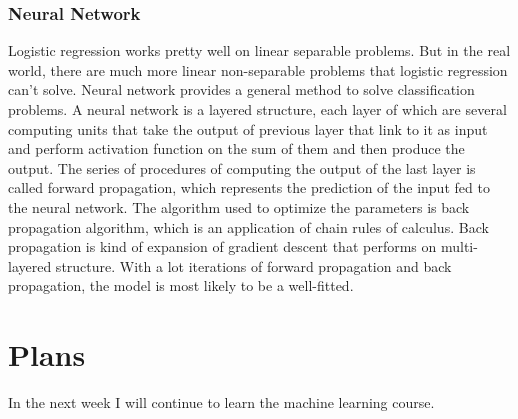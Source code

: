\documentclass{article} %
\begin{document}
\subsubsection{Neural Network}
Logistic regression works pretty well on linear separable problems. But in the real world, there are much more linear non-separable problems that logistic regression can't solve. Neural network provides a general method to solve classification problems. A neural network is a layered structure, each layer of which are several computing units that take the output of previous layer that link to it as input and perform activation function on the sum of them and then produce the output. The series of procedures of computing the output of the last layer is called forward propagation, which represents the prediction of the input fed to the neural network. The algorithm used to optimize the parameters is back propagation algorithm, which is an application of chain rules of calculus. Back propagation is kind of expansion of gradient descent that performs on multi-layered structure. With a lot iterations of forward propagation and back propagation, the model is most likely to be a well-fitted.

\section{Plans}
In the next week I will continue to learn the machine learning course.
\end{document}
